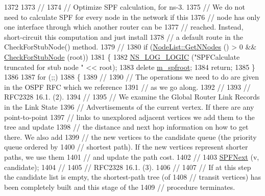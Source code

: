 \begin{DoxyCode}
1372 
1373 \textcolor{comment}{//}
1374 \textcolor{comment}{// Optimize SPF calculation, for ns-3.}
1375 \textcolor{comment}{// We do not need to calculate SPF for every node in the network if this}
1376 \textcolor{comment}{// node has only one interface through which another router can be }
1377 \textcolor{comment}{// reached.  Instead, short-circuit this computation and just install}
1378 \textcolor{comment}{// a default route in the CheckForStubNode() method.}
1379 \textcolor{comment}{//}
1380   \textcolor{keywordflow}{if} (\hyperlink{classns3_1_1NodeList_a1d110b1670005895dd5812baab13682a}{NodeList::GetNNodes} () > 0 && \hyperlink{classns3_1_1GlobalRouteManagerImpl_a84085f1fc0b4d7c9d18bf0145df3e01c}{CheckForStubNode} (root))
1381     \{
1382       \hyperlink{group__logging_ga88acd260151caf2db9c0fc84997f45ce}{NS\_LOG\_LOGIC} (\textcolor{stringliteral}{"SPFCalculate truncated for stub node "} << root);
1383       \textcolor{keyword}{delete} \hyperlink{classns3_1_1GlobalRouteManagerImpl_a977f6b62ef1f1b58d041a2f49c093a1c}{m\_spfroot};
1384       \textcolor{keywordflow}{return};
1385     \}
1386 
1387   \textcolor{keywordflow}{for} (;;)
1388     \{
1389 \textcolor{comment}{//}
1390 \textcolor{comment}{// The operations we need to do are given in the OSPF RFC which we reference}
1391 \textcolor{comment}{// as we go along.}
1392 \textcolor{comment}{//}
1393 \textcolor{comment}{// RFC2328 16.1. (2). }
1394 \textcolor{comment}{//}
1395 \textcolor{comment}{// We examine the Global Router Link Records in the Link State }
1396 \textcolor{comment}{// Advertisements of the current vertex.  If there are any point-to-point}
1397 \textcolor{comment}{// links to unexplored adjacent vertices we add them to the tree and update}
1398 \textcolor{comment}{// the distance and next hop information on how to get there.  We also add}
1399 \textcolor{comment}{// the new vertices to the candidate queue (the priority queue ordered by}
1400 \textcolor{comment}{// shortest path).  If the new vertices represent shorter paths, we use them}
1401 \textcolor{comment}{// and update the path cost.}
1402 \textcolor{comment}{//}
1403       \hyperlink{classns3_1_1GlobalRouteManagerImpl_aaa3d86729d6cfb61708d1c7083423da6}{SPFNext} (v, candidate);
1404 \textcolor{comment}{//}
1405 \textcolor{comment}{// RFC2328 16.1. (3). }
1406 \textcolor{comment}{//}
1407 \textcolor{comment}{// If at this step the candidate list is empty, the shortest-path tree (of}
1408 \textcolor{comment}{// transit vertices) has been completely built and this stage of the}
1409 \textcolor{comment}{// procedure terminates. }

\end{DoxyCode}
